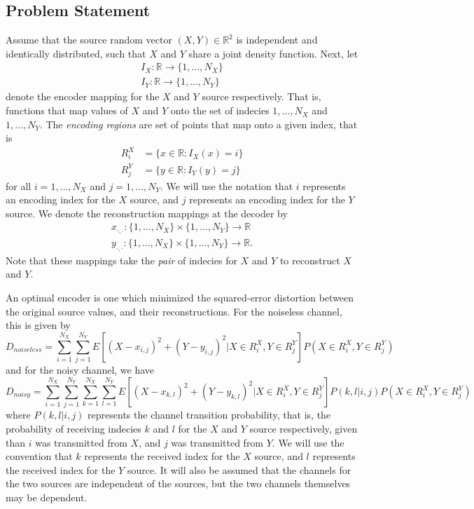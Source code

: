\documentclass[10pt]{article}
\newcommand{\real}{\mathbb{R}}
\begin{document}
\subsection{Problem Statement}
\label{sec:prob_state}
Assume that the source random vector $(X,Y)\in\real^2$ is independent and identically distributed, such that $X$ and $Y$ share a joint density function. Next, let
\begin{gather*}
    I_X : \real\to\{1,\ldots,N_X\} \\
    I_Y : \real\to\{1,\ldots,N_Y\}
\end{gather*}
denote the encoder mapping for the $X$ and $Y$ source respectively. That is, functions that map values of $X$ and $Y$ onto the set of indecies $1,\ldots,N_X$ and $1,\ldots,N_Y$. The \emph{encoding regions} are set of points that map onto a given index, that is
\begin{align*}
    R_i^X &= \{x\in\real : I_X(x) = i\} \\
    R_j^Y &= \{y\in\real : I_Y(y) = j\}
\end{align*}
for all $i=1,\ldots,N_X$ and $j=1,\ldots,N_Y$. We will use the notation that $i$ represents an encoding index for the $X$ source, and $j$ represents an encoding index for the $Y$ source. We denote the reconstruction mappings at the decoder by
\begin{gather*}
    x_{\cdot,\cdot} : \{1,\ldots,N_X\} \times \{1,\ldots,N_Y\} \to \real \\
    y_{\cdot,\cdot} : \{1,\ldots,N_X\} \times \{1,\ldots,N_Y\} \to \real.
\end{gather*}
Note that these mappings take the \emph{pair} of indecies for $X$ and $Y$ to reconstruct $X$ and $Y$.

An optimal encoder is one which minimized the squared-error distortion between the original source values, and their reconstructions. For the noiseless channel, this is given by
\begin{equation*}
    D_{noiseless} = \sum_{i=1}^{N_X}\sum_{j=1}^{N_Y} E[{(X-x_{i,j})}^2 + {(Y-y_{i,j})}^2 | X\in R_i^X, Y\in R_j^Y]P(X\in R_i^X, Y\in R_j^Y)
\end{equation*}
and for the noisy channel, we have
\begin{equation*}
    D_{noisy} = \sum_{i=1}^{N_X}\sum_{j=1}^{N_Y}\sum_{k=1}^{N_X}\sum_{l=1}^{N_Y} E[{(X-x_{k,l})}^2 + {(Y-y_{k,l})}^2 | X\in R_i^X, Y\in R_j^Y]P(k,l|i,j)P(X\in R_i^X, Y\in R_j^Y)
\end{equation*}
where $P(k,l|i,j)$ represents the channel transition probability, that is, the probability of receiving indecies $k$ and $l$ for the $X$ and $Y$ source respectively, given than $i$ was transmitted from $X$, and $j$ was transmitted from $Y$. We will use the convention that $k$ represents the received index for the $X$ source, and $l$ represents the received index for the $Y$ source. It will also be assumed that the channels for the two sources are independent of the sources, but the two channels themselves may be dependent.
\end{document}
